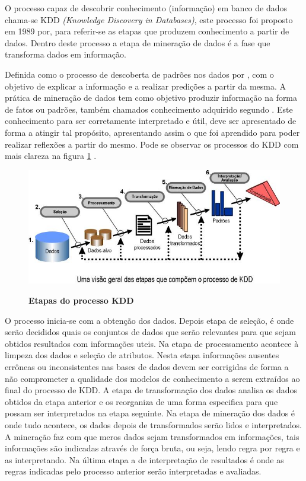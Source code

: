 \par O processo capaz de descobrir conhecimento (informação) em banco de dados chama-se KDD \emph{(Knowledge Discovery in Databases)}, este processo foi proposto em 1989 por\cite{fayyad1996data}, para referir-se as etapas que produzem conhecimento a partir de dados. Dentro deste processo a etapa de mineração de dados é a fase que transforma dados em informação.
\par Definida como o processo de descoberta de padrões nos dados por  \cite{fayyad1996data}, com o objetivo de explicar a informação e a realizar predições a partir da mesma. A prática de mineração de dados tem como objetivo produzir informação na forma de fatos ou padrões, também chamados conhecimento adquirido segundo \cite{fayyad1996data}. Este conhecimento para ser corretamente interpretado e útil, deve ser apresentado de forma a atingir tal propósito, apresentando assim o que foi aprendido para poder realizar reflexões a partir do mesmo. Pode se observar os processos do KDD com mais clareza na figura \ref{kdd} .
\begin{figure}[h]
	\caption{\textbf{Etapas do processo KDD}}
	\centering
		\includegraphics[width=\textwidth,height=\textheight, keepaspectratio]{figuras/processo de kdd.jpg}
		\label{kdd}
\end{figure}
\par O processo inicia-se com a obtenção dos dados. Depois etapa de seleção, é onde serão decididos quais os conjuntos de dados que serão relevantes para que sejam obtidos resultados com informações uteis. Na etapa de processamento acontece à limpeza dos dados e seleção de atributos. Nesta etapa informações ausentes errôneas ou inconsistentes nas bases de dados devem ser corrigidas de forma a não comprometer a qualidade dos modelos de conhecimento a serem extraídos ao final do processo de KDD. A etapa de transformação dos dados analisa os dados obtidos da etapa anterior e os reorganiza de uma forma especifica para que possam ser interpretados na etapa seguinte. Na etapa de mineração dos dados é onde tudo acontece, os dados depois de transformados serão lidos e interpretados. A mineração faz com que meros dados sejam transformados em informações, tais informações são indicadas através de força bruta, ou seja, lendo regra por regra e as interpretando. Na última etapa a de interpretação de resultados é onde as regras indicadas pelo processo anterior serão interpretadas e avaliadas. 
